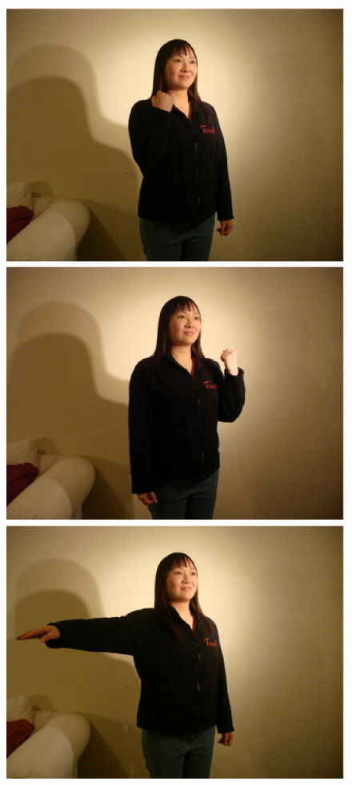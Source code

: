 \documentclass[12pt,a4,notitlepage]{report}
\renewcommand{\_}{\texttt{\symbol{95}}}
\newcommand{\<}{\texttt{\symbol{60}}}
\renewcommand{\>}{\texttt{\symbol{62}}}
\begin{document}
\begin{figure}
\centering
\includegraphics[scale=0.3,angle=0]{images/accel.ps}
\includegraphics[scale=0.3,angle=0]{images/decel.ps}
\includegraphics[scale=0.3,angle=0]{images/left.ps}

\end{figure}
\end{document}
